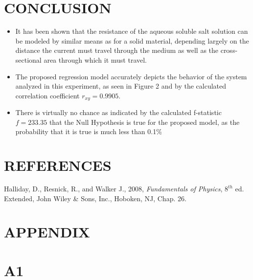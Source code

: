 \documentclass[12pt]{article}
\begin{document}
\section*{\fontsize{12}{12}\selectfont CONCLUSION}

\begin{itemize}

\item It has been shown that the resistance of the aqueous soluble salt solution can be modeled by similar means as for a solid material, depending largely on the distance the current must travel through the medium as well as the cross-sectional area through which it must travel.

\item The proposed regression model accurately depicts the behavior of the system analyzed in this experiment, as seen in Figure 2 and by the calculated correlation coefficient $r_{xy}=0.9905$.

\item There is virtually no chance as indicated by the calculated f-statistic $f=233.35$ that the Null Hypothesis is true for the proposed model, as the probability that it is true is much less than 0.1\%

\end{itemize}



\section*{\fontsize{12}{12}\selectfont REFERENCES}

\begin{thebibliography}{2}

Halliday, D., Resnick, R., and Walker J., 2008, \emph{Fundamentals of Physics}, $8^{th}$ ed. Extended, John Wiley \& Sons, Inc., Hoboken, NJ, Chap. 26.

\end{thebibliography}




\newpage


\section*{\fontsize{14}{14}\selectfont APPENDIX}

\hrulefill

\section*{\fontsize{12}{12}\selectfont A1}
\end{document}
